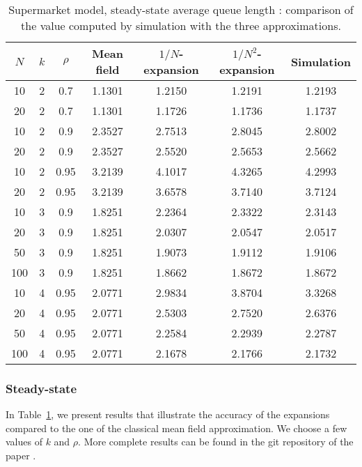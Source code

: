 \documentclass[sigconf]{acmart}
\begin{document}
\begin{table}[t]
  \centering
  \small 
  \begin{tabular}{@{}|@{ }ccc@{ }|@{}c@{}|@{}c@{}|@{}c@{}|@{}c@{}|@{}}
    \hline
    $N$&$k$&$\rho$&Mean field&$1/N$-expansion&$1/N^2$-expansion&Simulation\\
    \hline 
    10 & 2 & 0.7 	 &1.1301 &	1.2150 &	1.2191 &	1.2193 \\
    20 & 2 & 0.7 	 &1.1301 &	1.1726 &	1.1736 &	1.1737 \\
    \hline
    10 & 2 & 0.9 	 &2.3527 &	2.7513 &	2.8045 &	2.8002 \\
    20 & 2 & 0.9 	 &2.3527 &	2.5520 &	2.5653 &	2.5662 \\
    \hline
    10 & 2 & 0.95 	 &3.2139 &	4.1017 &	4.3265 &	4.2993 \\
    20 & 2 & 0.95 	 &3.2139 &	3.6578 &	3.7140 &	3.7124 \\
    \hline
    10 & 3 & 0.9 	 &1.8251 &	2.2364 &	2.3322 &	2.3143 \\
    20 & 3 & 0.9 	 &1.8251 &	2.0307 &	2.0547 &	2.0517 \\
    50 & 3 & 0.9 	 &1.8251 &	1.9073 &	1.9112 &	1.9106 \\
    100 & 3 & 0.9 	 &1.8251 &	1.8662 &	1.8672 &	1.8672 \\
    \hline
    10 & 4 & 0.95 	 &2.0771 &	2.9834 &	3.8704 &	3.3268 \\
    20 & 4 & 0.95 	 &2.0771 &	2.5303 &	2.7520 &	2.6376 \\
    50 & 4 & 0.95 	 &2.0771 &	2.2584 &	2.2939 &	2.2787 \\
    100 & 4 & 0.95 	 &2.0771 &	2.1678 &	2.1766 &	2.1732 \\
    \hline  \end{tabular}
  \caption{Supermarket model, steady-state average queue length :
    comparison of the value computed by simulation with the three
    approximations. }
  \label{tab:supermarket}
\end{table}

\subsubsection{Steady-state}

In Table~\ref{tab:supermarket}, we present results that illustrate the
accuracy of the expansions compared to the one of the classical mean
field approximation. We choose a few values of $k$ and $\rho$. More
complete results can be found in the git repository of the paper
\cite{githubPaper2018}.
\end{document}
